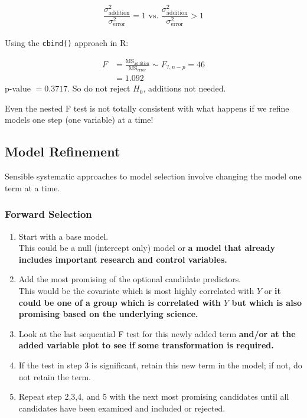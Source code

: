 \documentclass[a4paper, 11pt, twoside]{article}
\begin{document}
\[\frac{\sigma^2_{\text{addition}}}{\sigma^2_{\text{error}}}=1 \text{ vs. } \frac{\sigma^2_{\text{addition}}}{\sigma^2_{\text{error}}}>1 \]\\

Using the \texttt{cbind()} approach in R:

\[\begin{split}
F &= \frac{\text{MS}_\text{addition}}{\text{MS}_\text{error}}\sim F_{?, n-p}=46\\
&=1.092	
\end{split}
\]
p-value $=0.3717$. So do not reject $H_0$, additions not needed.

Even the nested F test is not totally consistent with what happens if we refine models one step (one variable) at a time!

\subsection{Model Refinement}

Sensible systematic approaches to model selection involve changing the model one term at a time.

\subsubsection{Forward Selection}

\begin{enumerate}
	\item Start with a base model.\\
	This could be a null (intercept only) model or \textbf{a model that already includes important  research and control variables.}
	\item Add the most promising of the optional candidate predictors.\\
	This would be the covariate which is most highly correlated with $Y$ or \textbf{ it could be one of a group which is correlated with $Y$ but which is also promising based on the underlying science.}
	\item Look at the last sequential F test for this newly added term \textbf{and/or at the added variable plot to see if some transformation is required.}
	\item If the test in step 3 is significant, retain this new term in the model; if not, do not retain the term.
	\item Repeat step 2,3,4, and 5 with the next most promising candidates until all candidates have been examined and included or rejected.
\end{enumerate}
\end{document}
